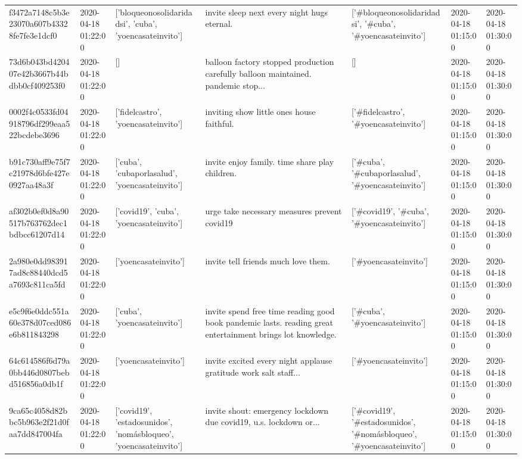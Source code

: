 \begin{tabular}{lllllll}
f3472a7148c5b3e23070a607b43328fe7fe3e1dcf0 & 2020-04-18 01:22:00 & ['bloqueonosolidaridadsi', 'cuba', 'yoencasateinvito'] & invite sleep next every night hugs eternal. & ['#bloqueonosolidaridadsi', '#cuba', '#yoencasateinvito'] & 2020-04-18 01:15:00 & 2020-04-18 01:30:00 \\
73d6b043bd420407e42b3667b44bdbb0cf409253f0 & 2020-04-18 01:22:00 & [] & balloon factory stopped production carefully balloon maintained. pandemic stop... & [] & 2020-04-18 01:15:00 & 2020-04-18 01:30:00 \\
0002f4c0533fd04918796df299eaa522bcdebe3696 & 2020-04-18 01:22:00 & ['fidelcastro', 'yoencasateinvito'] & inviting show little ones house faithful. & ['#fidelcastro', '#yoencasateinvito'] & 2020-04-18 01:15:00 & 2020-04-18 01:30:00 \\
b91c730aff9e75f7c21978d6bfe427e0927aa48a3f & 2020-04-18 01:22:00 & ['cuba', 'cubaporlasalud', 'yoencasateinvito'] & invite enjoy family. time share play children. & ['#cuba', '#cubaporlasalud', '#yoencasateinvito'] & 2020-04-18 01:15:00 & 2020-04-18 01:30:00 \\
af302b0ef0d8a90517b763762dec1bdbcc61207d14 & 2020-04-18 01:22:00 & ['covid19', 'cuba', 'yoencasateinvito'] & urge take necessary measures prevent covid19 & ['#covid19', '#cuba', '#yoencasateinvito'] & 2020-04-18 01:15:00 & 2020-04-18 01:30:00 \\
2a980e0dd983917ad8c88440dcd5a7693c811ca5fd & 2020-04-18 01:22:00 & ['yoencasateinvito'] & invite tell friends much love them. & ['#yoencasateinvito'] & 2020-04-18 01:15:00 & 2020-04-18 01:30:00 \\
e5c9f6e0ddc551a60e378d07ced086e6b811843298 & 2020-04-18 01:22:00 & ['cuba', 'yoencasateinvito'] & invite spend free time reading good book pandemic lasts. reading great entertainment brings lot knowledge. & ['#cuba', '#yoencasateinvito'] & 2020-04-18 01:15:00 & 2020-04-18 01:30:00 \\
64c614586f6d79a0bb446d0807bebd516856a0db1f & 2020-04-18 01:22:00 & ['yoencasateinvito'] & invite excited every night applause gratitude work salt staff... & ['#yoencasateinvito'] & 2020-04-18 01:15:00 & 2020-04-18 01:30:00 \\
9ca65c4058d82bbc5b963e2f21d0faa7dd847004fa & 2020-04-18 01:22:00 & ['covid19', 'estadosunidos', 'nomásbloqueo', 'yoencasateinvito'] & invite shout: emergency lockdown due covid19, u.s. lockdown or... & ['#covid19', '#estadosunidos', '#nomásbloqueo', '#yoencasateinvito'] & 2020-04-18 01:15:00 & 2020-04-18 01:30:00 \\

\end{tabular}
